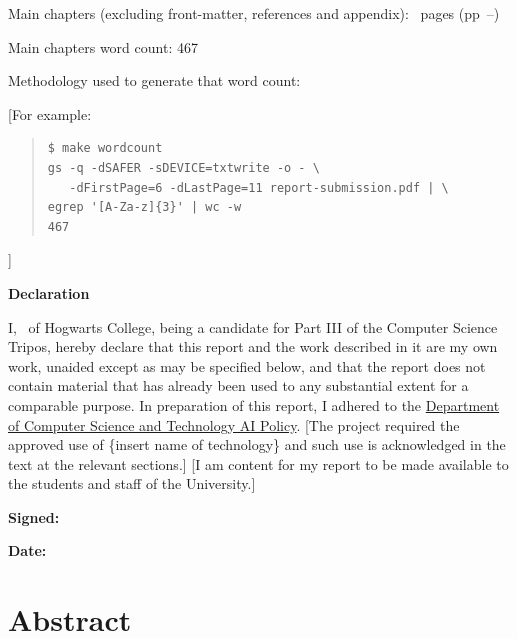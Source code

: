 \documentclass[12pt,a4paper,twoside]{report}
\newif\ifsubmission %
\newcommand{\candidatenumber}{1234N}
\newcommand{\college}{Hogwarts College}
\newcommand{\coursefor}{Part III of the Computer Science Tripos}
\begin{document}
\begin{sffamily}
Main chapters (excluding front-matter, references and appendix):
\contentpages~pages
(pp~\pageref{firstcontentpage}--\pageref{lastcontentpage})

Main chapters word count: 467

Methodology used to generate that word count:

[For example:

\begin{quote}
\begin{verbatim}
$ make wordcount
gs -q -dSAFER -sDEVICE=txtwrite -o - \
   -dFirstPage=6 -dLastPage=11 report-submission.pdf | \
egrep '[A-Za-z]{3}' | wc -w
467
\end{verbatim}
\end{quote}

]

\end{sffamily}

\vspace{\fill}
\onehalfspacing
\textbf{\Huge Declaration}
\vspace{40pt}

I,
\makeatletter\ifsubmission
\candidatenumber,
\else
\@author\ of \college,
\fi\makeatother
being a candidate for \coursefor, hereby declare that this report and
the work described in it are my own work, unaided except as may be
specified below, and that the report does not contain material that
has already been used to any substantial extent for a comparable
purpose.
In preparation of this report, I adhered to the
\href{https://www.cst.cam.ac.uk/files/ai_policy.pdf}{Department of
Computer Science and Technology AI Policy}. [The project required
the approved use of \{insert name of technology\} and such use is
acknowledged in the text at the relevant sections.] [I am content for
my report to be made available to the students and staff of the
University.]



\ifsubmission\else
\bigskip
\textbf{Signed:}
\fi

\bigskip
\textbf{Date:}
\vspace{\fill}

\chapter*{Abstract}
\end{document}
